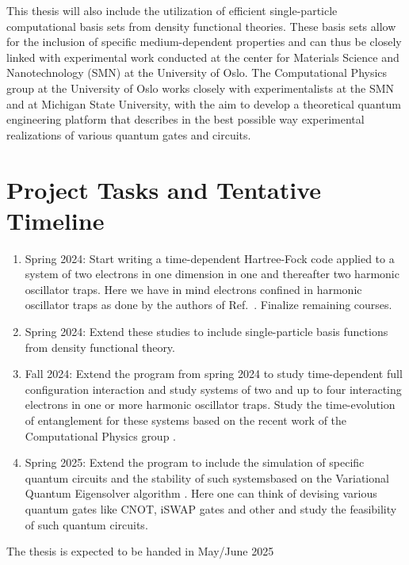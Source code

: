 \documentclass{article}
\begin{document}
This thesis will also include the utilization of efficient
single-particle computational basis sets from density functional
theories. These basis sets allow for the inclusion of specific
medium-dependent properties and can thus be closely linked with
experimental work conducted at the center for Materials Science and
Nanotechnology (SMN) at the University of Oslo. The Computational
Physics group at the University of Oslo works closely with
experimentalists at the SMN and at Michigan State University, with the
aim to develop a theoretical quantum engineering platform that
describes in the best possible way experimental realizations of
various quantum gates and circuits.


\section{Project Tasks and Tentative Timeline}


\begin{enumerate}
\item Spring 2024: Start writing a time-dependent Hartree-Fock code applied to a system of two electrons in one dimension in one and thereafter two harmonic oscillator traps. Here we have in mind electrons confined in harmonic oscillator traps as done by the authors of Ref.~\cite{Zanghellini2004}. Finalize remaining courses.
\item Spring 2024: Extend these studies to include single-particle basis functions from density functional theory.   
    \item Fall 2024: Extend the program from spring 2024 to study time-dependent full configuration interaction \cite{Skattum2013,Hochstuhl2014} and study systems of two and up to four interacting electrons in one or more harmonic oscillator traps. Study the time-evolution of entanglement for these systems based on the recent work of the Computational Physics group \cite{us2024}.
    \item Spring 2025: Extend the program to include the simulation of specific quantum circuits and the stability of such systemsbased on the Variational Quantum Eigensolver algorithm \cite{vqe}. Here one can think of devising various quantum gates like CNOT, iSWAP gates and other and study the feasibility of such quantum circuits.
\end{enumerate}
The thesis is expected to be handed in May/June 2025
\end{document}
